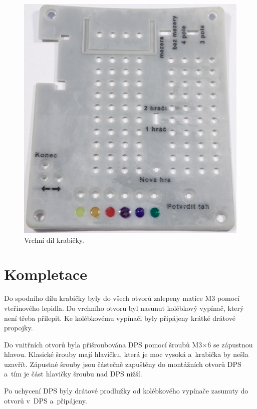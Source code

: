   \begin{figure}[!h]
    \begin{center}
        \includegraphics[scale=0.3]{obrazky/Krabicka_vrsek.jpg}
    \end{center}
    \caption[Vrchní díl krabičky]{Vrchní díl krabičky.}
    \end{figure}

\chapter{Kompletace} 
Do spodního dílu krabičky byly do všech otvorů zalepeny matice M3 pomocí vteřinového lepidla. Do vrchního otvoru byl nasunut kolébkový vypínač, který
není třeba přilepit. Ke kolébkovému vypínači byly připájeny krátké drátové propojky.  

Do vnitřních otvorů byla přišroubována DPS pomocí šroubů M3$\times$6 se zápustnou hlavou. Klasické šrouby mají hlavičku, která je moc vysoká a~krabička 
by nešla uzavřít. Zápustné šrouby jsou částečně zapuštěny do montážních otvorů DPS a~tím je část hlavičky šroubu nad DPS nižší. 

Po uchycení DPS byly drátové prodlužky od kolébkového vypínače zasunuty do otvorů v~DPS a~připájeny.

